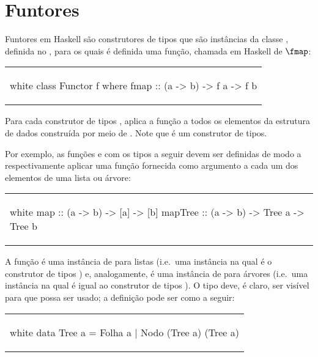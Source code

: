 \section{Funtores}
\label{Funtores}

Funtores em Haskell são construtores de tipos que são instâncias da
classe , definida no , para os quais é
definida uma função, chamada em Haskell de $\fmap$:

\begin{center}
\begin{tabular}{l}
\begin{alg}{.5\textwidth}{white}
class Functor f where
  fmap :: (a -> b) -> f a -> f b
\end{alg}
\end{tabular}
\end{center}

Para cada construtor de tipos ,  aplica a função
 a todos os elementos da estrutura de dados construída por meio
de . Note que  é um construtor de tipos.

Por exemplo, as funções  e  com os tipos a
seguir devem ser definidas de modo a respectivamente aplicar uma
função fornecida como argumento a cada um dos elementos de uma lista
ou árvore:

\begin{center}
\begin{tabular}{l}
\begin{alg}{.5\textwidth}{white}
map :: (a -> b) -> [a] -> [b]
mapTree :: (a -> b) -> Tree a -> Tree b
\end{alg}
\end{tabular}
\end{center}

A função  é uma instância de  para listas (i.e.~uma
instância na qual  é o construtor de tipos \ina{[]}) e,
analogamente,  é uma instância de  para árvores
(i.e.~uma instância na qual  é igual ao construtor de tipos
).  O tipo  deve, é claro, ser visível para que
 possa ser usado; a definição pode ser como a seguir:

\begin{center}
\begin{tabular}{l}
\begin{alg}{.5\textwidth}{white}
data Tree a = Folha a | Nodo (Tree a) (Tree a)
\end{alg}
\end{tabular}
\end{center}

